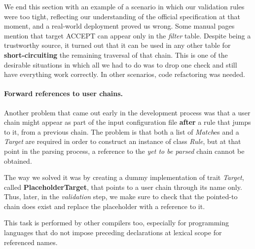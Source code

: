 We end this section with an example of a scenario in which our validation rules
were too tight, reflecting our understanding of the official specification at
that moment, and a real-world deployment proved us wrong.  Some manual pages
mention that target ACCEPT can appear only in the \emph{filter} table.  Despite
being a trustworthy source, it turned out that it can be used in any other
table for \textbf{short-circuiting} the remaining traversal of that chain.
This is one of the desirable situations in which all we had to do was to drop
one check and still have everything work correctly.  In other scenarios, code
refactoring was needed.

\paragraph{Forward references to user chains.}
Another problem that came out early in the development process was that a user
chain might appear as part of the input configuration file \textbf{after} a
rule that jumps to it, from a previous chain.  The problem is that both a list
of \emph{Match}es and a \emph{Target} are required in order to construct an
instance of class \emph{Rule}, but at that point in the parsing process, a
reference to the \emph{yet to be parsed} chain cannot be obtained.

The way we solved it was by creating a dummy implementation of trait
\emph{Target}, called \textbf{PlaceholderTarget}, that points to a user chain
through its name only.  Thus, later, in the \emph{validation} step, we make
sure to check that the pointed-to chain does exist and replace the placeholder
with a reference to it.

This task is performed by other compilers too, especially for programming
languages that do not impose preceding declarations at lexical scope for
referenced names.

